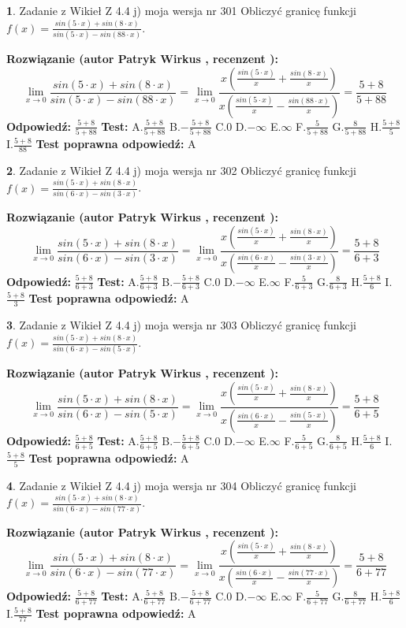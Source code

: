 \documentclass[12pt, a4paper]{article}
\theoremstyle{definition} %
\newtheorem{zad}{}
\newcommand{\zadStart}[1]{\begin{zad}#1\newline}
\newcommand{\zadStop}{\end{zad}}
\newcommand{\rozwStart}[2]{\noindent \textbf{Rozwiązanie (autor #1 , recenzent #2): }\newline}
\newcommand{\rozwStop}{\newline}
\newcommand{\odpStart}{\noindent \textbf{Odpowiedź:}\newline}
\newcommand{\odpStop}{\newline}
\newcommand{\testStart}{\noindent \textbf{Test:}\newline}
\newcommand{\testStop}{\newline}
\newcommand{\kluczStart}{\noindent \textbf{Test poprawna odpowiedź:}\newline}
\newcommand{\kluczStop}{\newline}
\begin{document}
\zadStart{Zadanie z Wikieł Z 4.4 j) moja wersja nr 301}
Obliczyć granicę funkcji $f(x)=\frac{sin(5\cdot x) +sin(8\cdot x)}{sin(5\cdot x) -sin(88\cdot x)}$.
\zadStop
\rozwStart{Patryk Wirkus}{}
$$\lim\limits_{x\to 0}\frac{sin(5\cdot x) +sin(8\cdot x)}{sin(5\cdot x) -sin(88\cdot x)}=\lim\limits_{x\to 0}\frac{x(\frac{sin(5\cdot x)}{x}+\frac{sin(8\cdot x)}{x})}{x(\frac{sin(5\cdot x)}{x}-\frac{sin(88\cdot x)}{x})}=\frac{5+8}{5+88}$$
\rozwStop
\odpStart
$\frac{5+8}{5+88}$
\odpStop
\testStart
A.$\frac{5+8}{5+88}$
B.$-\frac{5+8}{5+88}$
C.$0$
D.$-\infty$
E.$\infty$
F.$\frac{5}{5+88}$
G.$\frac{8}{5+88}$
H.$\frac{5+8}{5}$
I.$\frac{5+8}{88}$
\testStop
\kluczStart
A
\kluczStop



\zadStart{Zadanie z Wikieł Z 4.4 j) moja wersja nr 302}
Obliczyć granicę funkcji $f(x)=\frac{sin(5\cdot x) +sin(8\cdot x)}{sin(6\cdot x) -sin(3\cdot x)}$.
\zadStop
\rozwStart{Patryk Wirkus}{}
$$\lim\limits_{x\to 0}\frac{sin(5\cdot x) +sin(8\cdot x)}{sin(6\cdot x) -sin(3\cdot x)}=\lim\limits_{x\to 0}\frac{x(\frac{sin(5\cdot x)}{x}+\frac{sin(8\cdot x)}{x})}{x(\frac{sin(6\cdot x)}{x}-\frac{sin(3\cdot x)}{x})}=\frac{5+8}{6+3}$$
\rozwStop
\odpStart
$\frac{5+8}{6+3}$
\odpStop
\testStart
A.$\frac{5+8}{6+3}$
B.$-\frac{5+8}{6+3}$
C.$0$
D.$-\infty$
E.$\infty$
F.$\frac{5}{6+3}$
G.$\frac{8}{6+3}$
H.$\frac{5+8}{6}$
I.$\frac{5+8}{3}$
\testStop
\kluczStart
A
\kluczStop



\zadStart{Zadanie z Wikieł Z 4.4 j) moja wersja nr 303}
Obliczyć granicę funkcji $f(x)=\frac{sin(5\cdot x) +sin(8\cdot x)}{sin(6\cdot x) -sin(5\cdot x)}$.
\zadStop
\rozwStart{Patryk Wirkus}{}
$$\lim\limits_{x\to 0}\frac{sin(5\cdot x) +sin(8\cdot x)}{sin(6\cdot x) -sin(5\cdot x)}=\lim\limits_{x\to 0}\frac{x(\frac{sin(5\cdot x)}{x}+\frac{sin(8\cdot x)}{x})}{x(\frac{sin(6\cdot x)}{x}-\frac{sin(5\cdot x)}{x})}=\frac{5+8}{6+5}$$
\rozwStop
\odpStart
$\frac{5+8}{6+5}$
\odpStop
\testStart
A.$\frac{5+8}{6+5}$
B.$-\frac{5+8}{6+5}$
C.$0$
D.$-\infty$
E.$\infty$
F.$\frac{5}{6+5}$
G.$\frac{8}{6+5}$
H.$\frac{5+8}{6}$
I.$\frac{5+8}{5}$
\testStop
\kluczStart
A
\kluczStop



\zadStart{Zadanie z Wikieł Z 4.4 j) moja wersja nr 304}
Obliczyć granicę funkcji $f(x)=\frac{sin(5\cdot x) +sin(8\cdot x)}{sin(6\cdot x) -sin(77\cdot x)}$.
\zadStop
\rozwStart{Patryk Wirkus}{}
$$\lim\limits_{x\to 0}\frac{sin(5\cdot x) +sin(8\cdot x)}{sin(6\cdot x) -sin(77\cdot x)}=\lim\limits_{x\to 0}\frac{x(\frac{sin(5\cdot x)}{x}+\frac{sin(8\cdot x)}{x})}{x(\frac{sin(6\cdot x)}{x}-\frac{sin(77\cdot x)}{x})}=\frac{5+8}{6+77}$$
\rozwStop
\odpStart
$\frac{5+8}{6+77}$
\odpStop
\testStart
A.$\frac{5+8}{6+77}$
B.$-\frac{5+8}{6+77}$
C.$0$
D.$-\infty$
E.$\infty$
F.$\frac{5}{6+77}$
G.$\frac{8}{6+77}$
H.$\frac{5+8}{6}$
I.$\frac{5+8}{77}$
\testStop
\kluczStart
A
\kluczStop
\end{document}
